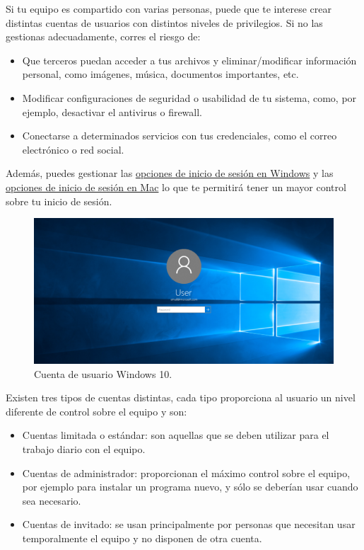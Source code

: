 \documentclass[
  spanish,
  a4paper,
  openany]{book}
\begin{document}
Si tu equipo es compartido con varias personas, puede que te interese crear distintas cuentas de usuarios con distintos niveles de privilegios. Si no las gestionas
adecuadamente, corres el riesgo de:

\begin{itemize}
\item
  Que terceros puedan acceder a tus archivos y eliminar/modificar información personal, como imágenes, música, documentos importantes, etc.
\item
  Modificar configuraciones de seguridad o usabilidad de tu sistema, como, por ejemplo, desactivar el antivirus o firewall.
\item
  Conectarse a determinados servicios con tus credenciales, como el correo electrónico o red social.
\end{itemize}

Además, puedes gestionar las \href{https://support.microsoft.com/es-es/windows/las-opciones-de-inicio-de-sesi\%C3\%B3n-de-windows-10-y-la-protecci\%C3\%B3n-de-la-cuenta-7b34d4cf-794f-f6bd-ddcc-e73cdf1a6fbf}{opciones de inicio de sesión en Windows} y las \href{https://support.apple.com/es-es/guide/mac-help/mtusr005/mac}{opciones de inicio de sesión en Mac} lo que te permitirá tener un mayor control sobre tu inicio de sesión.

\begin{figure}

{\centering \includegraphics[width=0.75\linewidth]{images/cuenta-usuario-windows-10} 

}

\caption{Cuenta de usuario Windows 10.}\label{fig:unnamed-chunk-9}
\end{figure}

Existen tres tipos de cuentas distintas, cada tipo proporciona al usuario un nivel diferente de control sobre el equipo y son:

\begin{itemize}
\item
  Cuentas limitada o estándar: son aquellas que se deben utilizar para el trabajo diario con el equipo.
\item
  Cuentas de administrador: proporcionan el máximo control sobre el equipo, por ejemplo para instalar un programa nuevo, y sólo se deberían usar cuando sea necesario.
\item
  Cuentas de invitado: se usan principalmente por personas que necesitan usar temporalmente el equipo y no disponen de otra cuenta.
\end{itemize}
\end{document}
